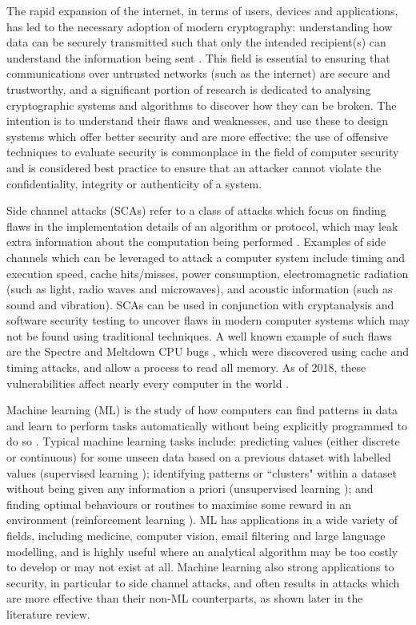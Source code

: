 \documentclass[a4paper,oneside,11pt]{article}
\begin{document}
The rapid expansion of the internet, in terms of users, devices and
applications, has led to the necessary adoption of modern cryptography:
understanding how data can be securely transmitted such that only the intended
recipient(s) can understand the information being sent
\cite{B/Introduction-Cryptography}. This field is essential to ensuring that
communications over untrusted networks (such as the internet) are secure and
trustworthy, and a significant portion of research is dedicated to analysing
cryptographic systems and algorithms to discover how they can be broken. The
intention is to understand their flaws and weaknesses, and use these to design
systems which offer better security and are more effective; the use of
offensive techniques to evaluate security is commonplace in the field of
computer security and is considered best practice to ensure that an attacker
cannot violate the confidentiality, integrity or authenticity of a system.

Side channel attacks (SCAs) refer to a class of attacks which focus on finding
flaws in the implementation details of an algorithm or protocol, which may leak
extra information about the computation being performed
\cite{B/Secure-ICs-Systems}. Examples of side channels which can be leveraged
to attack a computer system include timing and execution speed, cache
hits/misses, power consumption, electromagnetic radiation (such as light, radio
waves and microwaves), and acoustic information (such as sound and vibration).
SCAs can be used in conjunction with cryptanalysis and software security
testing to uncover flaws in modern computer systems which may not be found
using traditional techniques. A well known example of such flaws are the
Spectre and Meltdown CPU bugs \cite{A/Lipp-2020-Meltdown,
A/Kocher-2020-Spectre}, which were discovered using cache and timing attacks,
and allow a process to read all memory. As of 2018, these vulnerabilities
affect nearly every computer in the world \cite{W/Meltdown-and-Spectre}.

Machine learning (ML) is the study of how computers can find patterns in data
and learn to perform tasks automatically without being explicitly programmed to
do so \cite{B/Automated-Design-Genetic-Programming}. Typical machine learning
tasks include: predicting values (either discrete or continuous) for some
unseen data based on a previous dataset with labelled values (supervised
learning \cite{B/Foundations-of-Machine-Learning}); identifying patterns or
``clusters" within a dataset without being given any information a priori
(unsupervised learning \cite{B/Elements-Statistical-Learning}); and finding
optimal behaviours or routines to maximise some reward in an environment
(reinforcement learning \cite{B/Reinforcement-Learning}). ML has applications
in a wide variety of fields, including medicine, computer vision, email
filtering and large language modelling, and is highly useful where an
analytical algorithm may be too costly to develop or may not exist at all.
Machine learning also strong applications to security, in particular to side
channel attacks, and often results in attacks which are more effective than
their non-ML counterparts, as shown later in the literature review.
\end{document}

